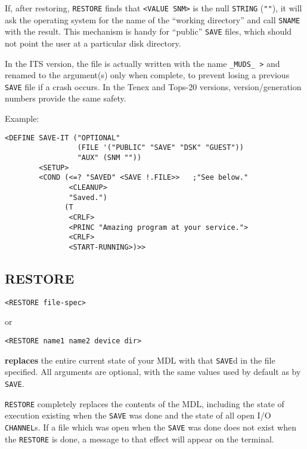 \documentclass[a4paper]{scrbook}
\begin{document}
If, after restoring, \texttt{RESTORE} finds that \texttt{\textless{}VALUE\ SNM\textgreater{}} is the null \texttt{STRING}
(\texttt{""}), it will ask the operating system for the name of the ``working directory'' and call \texttt{SNAME} with the
result. This mechanism is handy for ``public'' \texttt{SAVE} files, which should not point the user at a particular disk
directory.

In the ITS  version, the file is actually written with the name \texttt{\_MUDS\_\ \textgreater{}} and
renamed to the argument(s) only when complete, to prevent losing a previous \texttt{SAVE} file if a crash occurs. In the
Tenex  and Tops-20  versions, version/generation numbers provide the same
safety.

Example:

\begin{verbatim}
<DEFINE SAVE-IT ("OPTIONAL"
                 (FILE '("PUBLIC" "SAVE" "DSK" "GUEST"))
                 "AUX" (SNM ""))
        <SETUP>
        <COND (<=? "SAVED" <SAVE !.FILE>>   ;"See below."
               <CLEANUP>
               "Saved.")
              (T
               <CRLF>
               <PRINC "Amazing program at your service.">
               <CRLF>
               <START-RUNNING>)>>
\end{verbatim}

\subsection{RESTORE}\label{restore}

\begin{verbatim}
<RESTORE file-spec>
\end{verbatim}

or

\begin{verbatim}
<RESTORE name1 name2 device dir>
\end{verbatim}

 \textbf{replaces} the entire current state of your MDL with that \texttt{SAVE}d in the file
specified. All arguments are optional, with the same values used by default as by \texttt{SAVE}.

\texttt{RESTORE} completely replaces the contents of the MDL, including the state of execution existing when the
\texttt{SAVE} was done and the state of all open I/O \texttt{CHANNEL}s. If a file which was open when the \texttt{SAVE} was
done does not exist when the \texttt{RESTORE} is done, a message to that effect will appear on the terminal.
\end{document}
